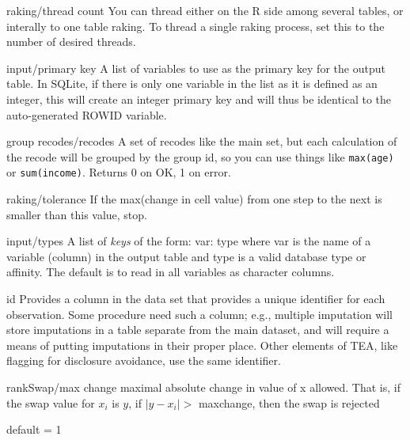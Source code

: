 \begin{key}{raking/thread count}
 You can thread either on the R side among several tables,
     or interally to one table raking. To thread a single raking process, set this to the
     number of desired threads. 
     
\end{key}

\begin{key}{input/primary key}
 A list of variables to use as the primary key for the output table.
In SQLite, if there is only one variable in the list as it is defined as an integer,
this will create an integer primary key and will thus be identical to the auto-generated
ROWID variable.
\end{key}

\begin{key}{group recodes/recodes}
 A set of recodes like the main set, but each calculation of the recode will be grouped by the group id, so you can use things like {\tt max(age)} or {\tt sum(income)}.
Returns 0 on OK, 1 on error.

\end{key}

\begin{key}{    raking/tolerance}
     If the max(change in cell value) from one step to the next
       is smaller than this value, stop. 
\end{key}

\begin{key}{input/types}
 A list of \emph{keys} of the form:
var: type
where var is the name of a variable (column) in the output table and type is a valid
database type or affinity.  The default is to read in all variables as character
columns.
\end{key}

\begin{key}{id}
 Provides a column in the data set that provides a unique identifier for each
observation.
Some procedure need such a column; e.g., multiple imputation will store imputations in a
table separate from the main dataset, and will require a means of putting imputations in
their proper place. Other elements of TEA, like flagging for disclosure avoidance, use the
same identifier.
\end{key}

\begin{key}{rankSwap/max change}
 maximal absolute change in value of x allowed.
That is, if the swap value for $x_i$ is $y$, if $|y - x_i| >$ maxchange,
then the swap is rejected

default = 1
\end{key}

